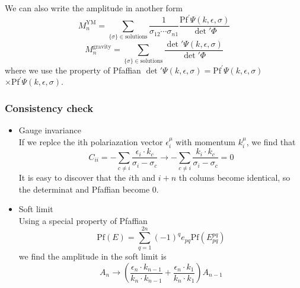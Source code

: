 \documentclass{beamer}
\begin{document}
\begin{frame}
    We can also write the amplitude in another form
    \begin{equation*}
        M_n^{\mathrm{YM}}=\sum_{\{\sigma\}\in\mathrm{solutions}}\frac{1}{\sigma_{12}\cdots\sigma_{n1}}\frac{\mathrm{Pf}^\prime \Psi(k,\epsilon,\sigma)}{\det{'}\Phi}
    \end{equation*}
    \begin{equation*}
        M_n^{\mathrm{gravity}}=\sum_{\{\sigma\}\in\mathrm{solutions}}\frac{\det{'}\Psi(k,\epsilon,\sigma)}{\det{'}\Phi}
    \end{equation*}
    where we use the property of Pfaffian $\det{'}\Psi(k,\epsilon,\sigma)=\mathrm{Pf}^\prime \Psi(k,\epsilon,\sigma)$\\$\times \mathrm{Pf}^\prime \Psi(k,\epsilon,\sigma)$.
\end{frame}
\begin{frame}
    \frametitle{Consistency check}
    \begin{itemize}
        \item \alert{Gauge invariance}\\
        If we replce the ith polariazation vector $\epsilon_i^\mu$ with momentum $k_i^\mu$, we find that
        \begin{equation*}
            C_{ii}=-\sum_{c\neq i}\frac{\epsilon_i\cdot k_c}{\sigma_i-\sigma_c} \to -\sum_{c\neq i}\frac{k_i\cdot k_c}{\sigma_i-\sigma_c}=0
        \end{equation*}
        It is easy to discover that the $i$th and $i+n$ th colums become identical, so the determinat and Pfaffian become 0.
        \pause
        \item \alert{Soft limit}\\
        Using a special property of Pfaffian
        \begin{equation*}
            \mathrm{Pf} (E)=\sum_{q=1}^{2n}(-1)^q e_{pq}\mathrm{Pf}(E^{pq}_{pq})
        \end{equation*}
        we find the amplitude in the soft limit is 
        \begin{equation*}
            A_n\to\left(\frac{\epsilon_n\cdot k_{n-1}}{k_n\cdot k_{n-1}}+\frac{\epsilon_n\cdot k_1}{k_n\cdot k_1}\right)A_{n-1}
        \end{equation*}
    \end{itemize}
\end{frame}
\end{document}
